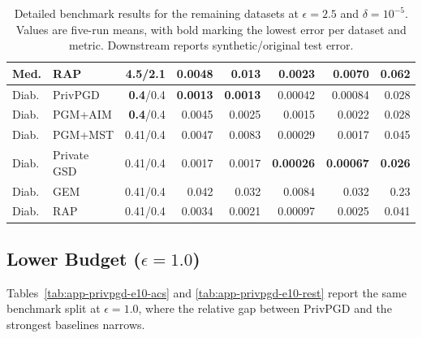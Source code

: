 \begin{table}[!tbp]
{\begin{tabular}{llrrrrrr}
    Med. & RAP & 4.5/2.1 & 0.0048 & 0.013 & 0.0023 & 0.0070 & 0.062 \\
    \midrule
    Diab. & PrivPGD & \textbf{0.4}/0.4 & \textbf{0.0013} & \textbf{0.0013} & 0.00042 & 0.00084 & 0.028 \\
    Diab. & PGM+AIM & \textbf{0.4}/0.4 & 0.0045 & 0.0025 & 0.0015 & 0.0022 & 0.028 \\
    Diab. & PGM+MST & 0.41/0.4 & 0.0047 & 0.0083 & 0.00029 & 0.0017 & 0.045 \\
    Diab. & Private GSD & 0.41/0.4 & 0.0017 & 0.0017 & \textbf{0.00026} & \textbf{0.00067} & \textbf{0.026} \\
    Diab. & GEM & 0.41/0.4 & 0.042 & 0.032 & 0.0084 & 0.032 & 0.23 \\
    Diab. & RAP & 0.41/0.4 & 0.0034 & 0.0021 & 0.00097 & 0.0025 & 0.041 \\
    \bottomrule
  \end{tabular}}
  \caption{Detailed benchmark results for the remaining datasets at \(\epsilon = 2.5\) and \(\delta = 10^{-5}\). Values are five-run means, with bold marking the lowest error per dataset and metric. Downstream reports synthetic/original test error.}
  \label{tab:app-privpgd-e25-rest}
\end{table}

\clearpage
\subsection{Lower Budget (\texorpdfstring{$\epsilon = 1.0$}{epsilon = 1.0})}

Tables~\ref{tab:app-privpgd-e10-acs} and \ref{tab:app-privpgd-e10-rest} report the same benchmark split at \(\epsilon = 1.0\), where the relative gap between PrivPGD and the strongest baselines narrows.

